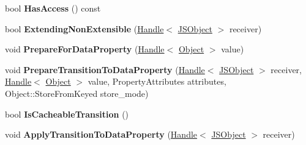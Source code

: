 \begin{DoxyCompactItemize}
\item 
bool {\bfseries Has\+Access} () const \hypertarget{classv8_1_1internal_1_1_b_a_s_e___e_m_b_e_d_d_e_d_a4dd84287cb2572ba53cbb58215a1fed4}{}\label{classv8_1_1internal_1_1_b_a_s_e___e_m_b_e_d_d_e_d_a4dd84287cb2572ba53cbb58215a1fed4}

\item 
bool {\bfseries Extending\+Non\+Extensible} (\hyperlink{classv8_1_1internal_1_1_handle}{Handle}$<$ \hyperlink{classv8_1_1internal_1_1_j_s_object}{J\+S\+Object} $>$ receiver)\hypertarget{classv8_1_1internal_1_1_b_a_s_e___e_m_b_e_d_d_e_d_adda60ffa770f344b875bbaa35487507d}{}\label{classv8_1_1internal_1_1_b_a_s_e___e_m_b_e_d_d_e_d_adda60ffa770f344b875bbaa35487507d}

\item 
void {\bfseries Prepare\+For\+Data\+Property} (\hyperlink{classv8_1_1internal_1_1_handle}{Handle}$<$ \hyperlink{classv8_1_1internal_1_1_object}{Object} $>$ value)\hypertarget{classv8_1_1internal_1_1_b_a_s_e___e_m_b_e_d_d_e_d_ab7f6462ab287e78fdb58a98955aace94}{}\label{classv8_1_1internal_1_1_b_a_s_e___e_m_b_e_d_d_e_d_ab7f6462ab287e78fdb58a98955aace94}

\item 
void {\bfseries Prepare\+Transition\+To\+Data\+Property} (\hyperlink{classv8_1_1internal_1_1_handle}{Handle}$<$ \hyperlink{classv8_1_1internal_1_1_j_s_object}{J\+S\+Object} $>$ receiver, \hyperlink{classv8_1_1internal_1_1_handle}{Handle}$<$ \hyperlink{classv8_1_1internal_1_1_object}{Object} $>$ value, Property\+Attributes attributes, Object\+::\+Store\+From\+Keyed store\+\_\+mode)\hypertarget{classv8_1_1internal_1_1_b_a_s_e___e_m_b_e_d_d_e_d_aa4461c3b920cbbe8eede47ee5ec01ba6}{}\label{classv8_1_1internal_1_1_b_a_s_e___e_m_b_e_d_d_e_d_aa4461c3b920cbbe8eede47ee5ec01ba6}

\item 
bool {\bfseries Is\+Cacheable\+Transition} ()\hypertarget{classv8_1_1internal_1_1_b_a_s_e___e_m_b_e_d_d_e_d_a45d6340a530a8bdc50dc5d481ab6aa00}{}\label{classv8_1_1internal_1_1_b_a_s_e___e_m_b_e_d_d_e_d_a45d6340a530a8bdc50dc5d481ab6aa00}

\item 
void {\bfseries Apply\+Transition\+To\+Data\+Property} (\hyperlink{classv8_1_1internal_1_1_handle}{Handle}$<$ \hyperlink{classv8_1_1internal_1_1_j_s_object}{J\+S\+Object} $>$ receiver)\hypertarget{classv8_1_1internal_1_1_b_a_s_e___e_m_b_e_d_d_e_d_aa0de6f6684b94216ff377ee0f86a8160}{}\label{classv8_1_1internal_1_1_b_a_s_e___e_m_b_e_d_d_e_d_aa0de6f6684b94216ff377ee0f86a8160}


\end{DoxyCompactItemize}
